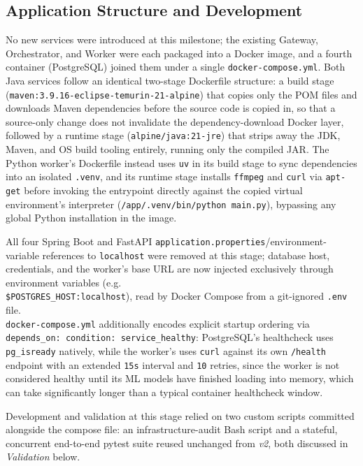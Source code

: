 \documentclass[twoside]{supsistudent}
\begin{document}
\subsection{Application Structure and Development}
No new services were introduced at this milestone; the existing Gateway, Orchestrator, and Worker were each packaged into a Docker image, and a fourth container (PostgreSQL) joined them under a single \texttt{docker-compose.yml}. Both Java services follow an identical two-stage Dockerfile structure: a build stage (\texttt{maven:3.9.16-eclipse-temurin-21-alpine}) that copies only the POM files and downloads Maven dependencies before the source code is copied in, so that a source-only change does not invalidate the dependency-download Docker layer, followed by a runtime stage (\texttt{alpine/java:21-jre}) that strips away the JDK, Maven, and OS build tooling entirely, running only the compiled JAR. The Python worker's Dockerfile instead uses \texttt{uv} in its build stage to sync dependencies into an isolated \texttt{.venv}, and its runtime stage installs \texttt{ffmpeg} and \texttt{curl} via \texttt{apt-get} before invoking the entrypoint directly against the copied virtual environment's interpreter (\texttt{/app/.venv/bin/python main.py}), bypassing any global Python installation in the image.

All four Spring Boot and FastAPI \texttt{application.properties}/environment-variable references to \texttt{localhost} were removed at this stage; database host, credentials, and the worker's base URL are now injected exclusively through environment variables (e.g. \\ \texttt{\${POSTGRES\_HOST:localhost}}), read by Docker Compose from a git-ignored \texttt{.env} file. \\ \texttt{docker-compose.yml} additionally encodes explicit startup ordering via \\ \texttt{depends\_on: condition: service\_healthy}: PostgreSQL's healthcheck uses \\ \texttt{pg\_isready} natively, while the worker's uses \texttt{curl} against its own \texttt{/health} endpoint with an extended \texttt{15s} interval and \texttt{10} retries, since the worker is not considered healthy until its ML models have finished loading into memory, which can take significantly longer than a typical container healthcheck window.

Development and validation at this stage relied on two custom scripts committed alongside the compose file: an infrastructure-audit Bash script and a stateful, concurrent end-to-end pytest suite reused unchanged from \emph{v2}, both discussed in \emph{Validation} below.
\end{document}
